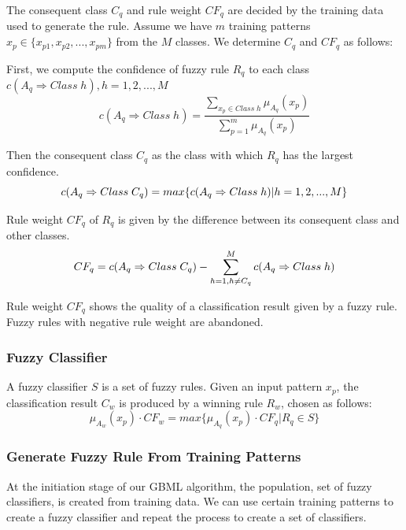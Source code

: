 \documentclass[conference]{IEEEtran}
\begin{document}
  The consequent class $C_q$ and rule weight $CF_q$ are decided by the training data used to generate the rule. 
  Assume we have $m$ training patterns $x_{p} \in \{x_{p1},x_{p2},...,x_{pm}\}$ from the $M$ classes. We determine $C_q$ and $CF_q$ as follows:

  First, we compute the confidence of fuzzy rule $R_q$ to each class $c(A_q \Rightarrow Class\;h), h = 1,2,...,M$
\begin{equation}
c(A_q \Rightarrow Class\; h) = \frac{\sum\limits_{x_p \in Class\;h}\mu_{A_q}(x_p)}{\sum\limits_{p=1}^m\mu_{A_q}(x_p)}
\end{equation}

  Then the consequent class $C_q$ as the class with which $R_q$ has the largest confidence.
  \begin{equation}
  \scriptsize c(A_q \Rightarrow Class\;C_q)=max\{c(A_q \Rightarrow Class\;h)|h=1,2,...,M\}
\end{equation}
  
  Rule weight $CF_q$ of $R_q$ is given by the difference between its consequent class and other classes.
  \begin{equation}
  \scriptsize CF_q = c(A_q\Rightarrow Class\;C_q)-\sum\limits_{h=1, h\neq C_q}^{M}c(A_q\Rightarrow Class \; h)
\end{equation}

  Rule weight $CF_q$  shows the quality of a classification result given by a fuzzy rule. Fuzzy rules with negative rule weight are abandoned.
  
  \subsubsection{Fuzzy Classifier}
  
  A fuzzy classifier $S$ is a set of fuzzy rules. Given an input pattern $x_p$, the classification result $C_w$ is produced by a winning rule $R_w$, chosen as follows:
  \begin{equation}\mu_{A_w}(x_p) \cdot CF_w = max\{\mu_{A_q}(x_p)\cdot CF_q|R_q\in S\}\end{equation}
  \subsubsection{Generate Fuzzy Rule From Training Patterns}
  At the initiation stage of our GBML algorithm, the population, set of fuzzy classifiers, is created from training data. We can use certain training patterns to create a fuzzy classifier and repeat the process to create a set of classifiers.
  
\end{document}
